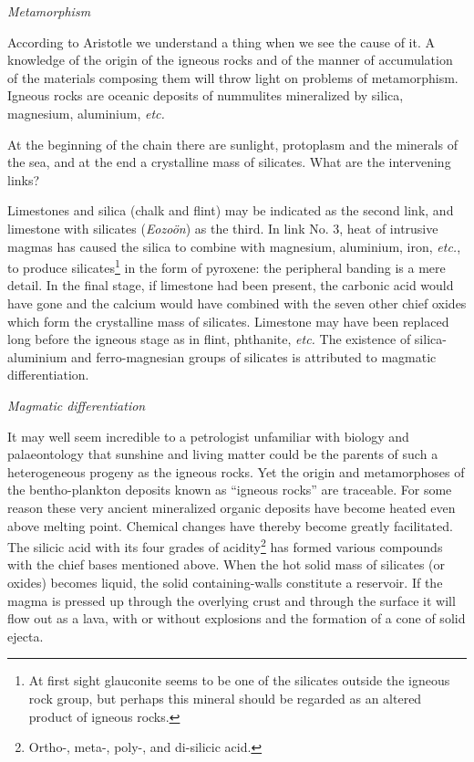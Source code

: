 \documentclass[a4paper, 12pt, oneside, landscape]{article}
\begin{document}
\bigskip
\centerline{\emph{Metamorphism}}

According to Aristotle we understand a thing when we see the cause of it. A knowledge of the origin of the igneous rocks and of the manner of accumulation of the materials composing them will throw light on problems of metamorphism. Igneous rocks are oceanic deposits of nummulites mineralized by silica, magnesium, aluminium, \emph{etc.}

At the beginning of the chain there are sunlight, protoplasm and the minerals of the sea, and at the end a crystalline mass of silicates. What are the intervening links?

Limestones and silica (chalk and flint) may be indicated as the second link, and limestone with silicates (\emph{Eozoön}) as the third. In link No. 3, heat of intrusive magmas has caused the silica to combine with magnesium, aluminium, iron, \emph{etc.}, to produce silicates\footnote{At first sight glauconite seems to be one of the silicates outside the igneous rock group, but perhaps this mineral should be regarded as an altered product of igneous rocks.} in the form of pyroxene: the peripheral banding is a mere detail. In the final stage, if limestone had been present, the carbonic acid would have gone and the calcium would have combined with the seven other chief oxides which form the crystalline mass of silicates. Limestone may have been replaced long before the igneous stage as in flint, phthanite, \emph{etc.} The existence of silica-aluminium and ferro-magnesian groups of silicates is attributed to magmatic differentiation.

\bigskip
\centerline{\emph{Magmatic differentiation}}

It may well seem incredible to a petrologist unfamiliar with biology and palaeontology that sunshine and living matter could be the parents of such a heterogeneous progeny as the igneous rocks. Yet the origin and metamorphoses of the bentho-plankton deposits known as ``igneous rocks'' are traceable. For some reason these very ancient mineralized organic deposits have become heated even above melting point. Chemical changes have thereby become greatly facilitated. The silicic acid with its four grades of acidity\footnote{Ortho-, meta-, poly-, and di-silicic acid.} has formed various compounds with the chief bases mentioned above. When the hot solid mass of silicates (or oxides) becomes liquid, the solid containing-walls constitute a reservoir. If the magma is pressed up through the overlying crust and through the surface it will flow out as a lava, with or without explosions and the formation of a cone of solid ejecta.
\end{document}
